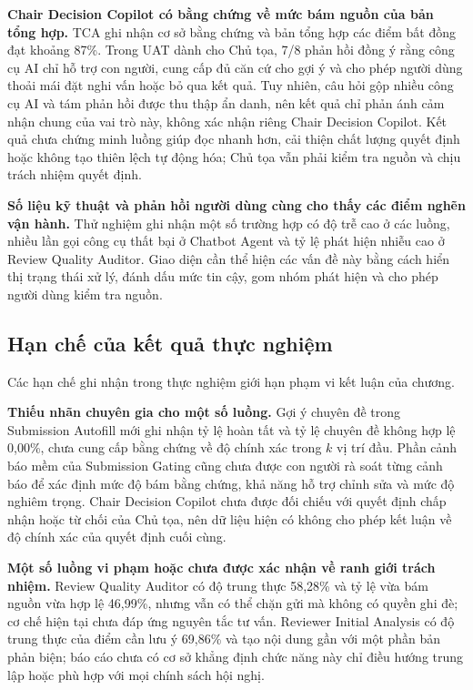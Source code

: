 \textbf{Chair Decision Copilot có bằng chứng về mức bám nguồn của bản tổng hợp.} TCA ghi nhận cơ sở bằng chứng và bản tổng hợp các điểm bất đồng đạt khoảng 87\%. Trong UAT dành cho Chủ tọa, 7/8 phản hồi đồng ý rằng công cụ AI chỉ hỗ trợ con người, cung cấp đủ căn cứ cho gợi ý và cho phép người dùng thoải mái đặt nghi vấn hoặc bỏ qua kết quả. Tuy nhiên, câu hỏi gộp nhiều công cụ AI và tám phản hồi được thu thập ẩn danh, nên kết quả chỉ phản ánh cảm nhận chung của vai trò này, không xác nhận riêng Chair Decision Copilot. Kết quả chưa chứng minh luồng giúp đọc nhanh hơn, cải thiện chất lượng quyết định hoặc không tạo thiên lệch tự động hóa; Chủ tọa vẫn phải kiểm tra nguồn và chịu trách nhiệm quyết định.

\textbf{Số liệu kỹ thuật và phản hồi người dùng cùng cho thấy các điểm nghẽn vận hành.} Thử nghiệm ghi nhận một số trường hợp có độ trễ cao ở các luồng, nhiều lần gọi công cụ thất bại ở Chatbot Agent và tỷ lệ phát hiện nhiễu cao ở Review Quality Auditor. Giao diện cần thể hiện các vấn đề này bằng cách hiển thị trạng thái xử lý, đánh dấu mức tin cậy, gom nhóm phát hiện và cho phép người dùng kiểm tra nguồn.

\subsection{Hạn chế của kết quả thực nghiệm}

Các hạn chế ghi nhận trong thực nghiệm giới hạn phạm vi kết luận của chương.

\textbf{Thiếu nhãn chuyên gia cho một số luồng.} Gợi ý chuyên đề trong Submission Autofill mới ghi nhận tỷ lệ hoàn tất và tỷ lệ chuyên đề không hợp lệ 0,00\%, chưa cung cấp bằng chứng về độ chính xác trong $k$ vị trí đầu. Phần cảnh báo mềm của Submission Gating cũng chưa được con người rà soát từng cảnh báo để xác định mức độ bám bằng chứng, khả năng hỗ trợ chỉnh sửa và mức độ nghiêm trọng. Chair Decision Copilot chưa được đối chiếu với quyết định chấp nhận hoặc từ chối của Chủ tọa, nên dữ liệu hiện có không cho phép kết luận về độ chính xác của quyết định cuối cùng.

\textbf{Một số luồng vi phạm hoặc chưa được xác nhận về ranh giới trách nhiệm.} Review Quality Auditor có độ trung thực 58,28\% và tỷ lệ vừa bám nguồn vừa hợp lệ 46,99\%, nhưng vẫn có thể chặn gửi mà không có quyền ghi đè; cơ chế hiện tại chưa đáp ứng nguyên tắc tư vấn. Reviewer Initial Analysis có độ trung thực của điểm cần lưu ý 69,86\% và tạo nội dung gần với một phần bản phản biện; báo cáo chưa có cơ sở khẳng định chức năng này chỉ điều hướng trung lập hoặc phù hợp với mọi chính sách hội nghị.

